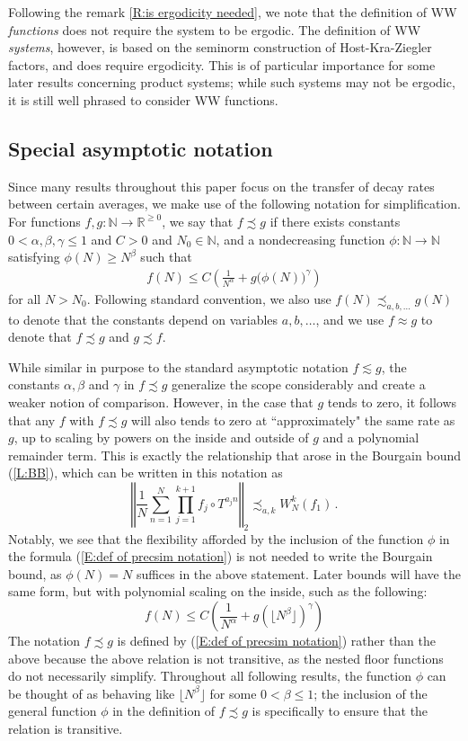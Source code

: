 \documentclass[11pt, oneside]{amsart}   	%
\newcommand{\R}{\mathbb{R}}
\newcommand{\1}{\mathbbm{1}}
\newcommand{\N}{\mathbb{N}}
\newcommand{\floor}[1]{\lfloor#1\rfloor}
\theoremstyle{definition}
\begin{document}
Following the remark \ref{R:is ergodicity needed}, we note that the definition of WW \textit{functions} does not require the system to be ergodic. The definition of WW \textit{systems}, however, is based on the seminorm construction of Host-Kra-Ziegler factors, and does require ergodicity. This is of particular importance for some later results concerning product systems; while such systems may not be ergodic, it is still well phrased to consider WW functions.



\subsection{Special asymptotic notation}\label{S:special asymp}
Since many results throughout this paper focus on the transfer of decay rates between certain averages, we make use of the following notation for simplification. For functions $f, g:\N \to \R^{\geq 0}$, we say that $f \precsim g$ if there exists constants $0 < \alpha, \beta, \gamma \leq 1$ and $C >0$ and $N_0\in \mathbb{N}$, and a nondecreasing function $\phi: \N \to \N$ satisfying $\phi(N) \geq N^\beta$ such that
\begin{align}\label{E:def of precsim notation}
f(N) \leq C\left(\frac{1}{N^\alpha} + g\Big( \phi(N)\Big)^\gamma\right)
\end{align}
for all $N > N_0$. Following standard convention, we also use $f(N) \precsim_{a, b, \dots} g(N)$ to denote that the constants depend on variables $a, b, \dots$, and we use $f \approx g$ to denote that $f \precsim g$ and $g \precsim f$.

While similar in purpose to the standard asymptotic notation $f\lesssim g$, the constants $\alpha, \beta$ and $\gamma$ in $f\precsim g$ generalize the scope considerably and create a weaker notion of comparison. However, in the case that $g$ tends to zero, it follows that any $f$ with $f \precsim g$ will also tends to zero at ``approximately" the same rate as $g$, up to scaling by powers on the inside and outside of $g$ and a polynomial remainder term. This is exactly the relationship that arose in the Bourgain bound (\ref{L:BB}), which can be written in this notation as
$$\left\Vert \frac{1}{N}\sum_{n=1}^N \prod_{j=1}^{k+1} f_j \circ T^{a_j n} \right \Vert_2 \precsim_{a, k} W_N^k (f_1)\, .$$
Notably, we see that the flexibility afforded by the inclusion of the function $\phi$ in the formula (\ref{E:def of precsim notation}) is not needed to write the Bourgain bound, as $\phi(N) = N$ suffices in the above statement. Later bounds will have the same form, but with polynomial scaling on the inside, such as the following:
$$f(N) \leq C\left(\frac{1}{N^\alpha} + g\left( \floor{N^\beta}\right)^\gamma\right)$$
The notation $f\precsim g$ is defined by (\ref{E:def of precsim notation}) rather than the above because the above relation is not transitive, as the nested floor functions do not necessarily simplify. Throughout all following results, the function $\phi$ can be thought of as behaving like $\floor{N^\beta}$ for some $0 < \beta \leq 1$; the inclusion of the general function $\phi$ in the definition of $f\precsim g$ is specifically to ensure that the relation is transitive.
\end{document}
